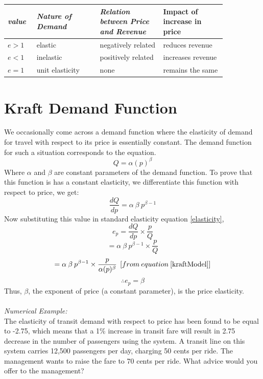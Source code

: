 \begin{tabular}{|p{0.1\linewidth} | p{0.25\linewidth} | p{0.25\linewidth} | p{0.25\linewidth}|}
	\hline
	\textit{value} & \textit{Nature of Demand} & \textit{Relation between Price and Revenue} & Impact of increase in price\\
	\hline
	$ e > 1 $ & elastic & negatively related & reduces revenue\\
	$ e < 1 $ & inelastic & positively related & increases revenue\\
	$ e = 1 $ & unit elasticity & none & remains the same\\
	\hline
\end{tabular}
%
\section{Kraft Demand Function}
We occasionally come across a demand function where the elasticity of demand for travel with respect to its price is essentially constant. The demand function for such a situation corresponds to the equation.
\begin{equation}
	Q = \alpha (p)^\beta
	\label{kraftModel}
\end{equation}
Where $\alpha$ and $\beta$ are constant parameters of the demand function. To prove that this function is has a constant elasticity, we differentiate this function with respect to price, we get:
$$ \frac{dQ}{dp} = \alpha \: \beta \: p^{\beta - 1}$$
Now substituting this value in standard elasticity equation \ref{elasticity},
$$ e_p = \frac{dQ}{dp} \times \frac{p}{Q}$$
$$= \alpha \: \beta \: p^{\beta - 1} \times \frac{p}{Q}$$
$$= \alpha \: \beta \: p^{\beta - 1} \times \frac{p}{\alpha (p)^\beta} \: \: [from \: equation \: \ref{kraftModel}]$$
\begin{equation}
	\therefore e_p = \beta
\end{equation}
Thus, $\beta$, the exponent of price (a constant parameter), is the price elasticity.\\\\
\textit{Numerical Example:}\\
The elasticity of transit demand with respect to price has been found to be equal to -2.75, which means that a 1\% increase in transit fare will result in 2.75 decrease in the number of passengers using the system. A transit line on this system carries 12,500 passengers per day, charging 50 cents per ride. The management wants to raise the fare to 70 cents per ride. What advice would you offer to the management?\\
